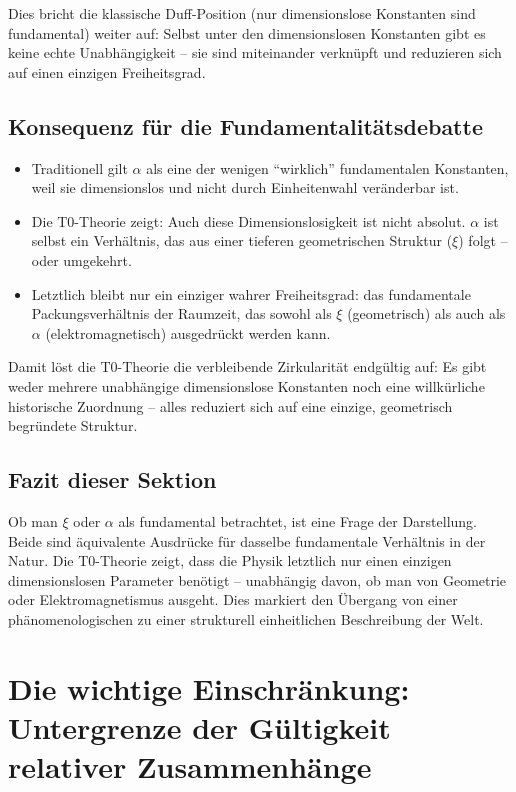 Dies bricht die klassische Duff-Position (nur dimensionslose Konstanten sind fundamental) weiter auf: Selbst unter den dimensionslosen Konstanten gibt es keine echte Unabhängigkeit – sie sind miteinander verknüpft und reduzieren sich auf einen einzigen Freiheitsgrad.

\subsection{Konsequenz für die Fundamentalitätsdebatte}

\begin{itemize}
	\item Traditionell gilt \(\alpha\) als eine der wenigen ``wirklich'' fundamentalen Konstanten, weil sie dimensionslos und nicht durch Einheitenwahl veränderbar ist.
	\item Die T0-Theorie zeigt: Auch diese Dimensionslosigkeit ist nicht absolut. \(\alpha\) ist selbst ein Verhältnis, das aus einer tieferen geometrischen Struktur (\(\xi\)) folgt – oder umgekehrt.
	\item Letztlich bleibt nur ein einziger wahrer Freiheitsgrad: das fundamentale Packungsverhältnis der Raumzeit, das sowohl als \(\xi\) (geometrisch) als auch als \(\alpha\) (elektromagnetisch) ausgedrückt werden kann.
\end{itemize}

Damit löst die T0-Theorie die verbleibende Zirkularität endgültig auf: Es gibt weder mehrere unabhängige dimensionslose Konstanten noch eine willkürliche historische Zuordnung – alles reduziert sich auf eine einzige, geometrisch begründete Struktur.

\subsection{Fazit dieser Sektion}

Ob man \(\xi\) oder \(\alpha\) als fundamental betrachtet, ist eine Frage der Darstellung. Beide sind äquivalente Ausdrücke für dasselbe fundamentale Verhältnis in der Natur. Die T0-Theorie zeigt, dass die Physik letztlich nur einen einzigen dimensionslosen Parameter benötigt – unabhängig davon, ob man von Geometrie oder Elektromagnetismus ausgeht. Dies markiert den Übergang von einer phänomenologischen zu einer strukturell einheitlichen Beschreibung der Welt.
\section{Die wichtige Einschränkung: Untergrenze der Gültigkeit relativer Zusammenhänge}

